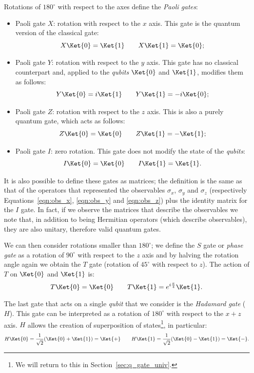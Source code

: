 Rotations of $180^\circ$ with respect to the axes define the \emph{Paoli gates}:
\begin{itemize}
	\item Paoli gate $X$: rotation with respect to the $x$ axis. This gate is the quantum version of the classical  gate:
	\[
	X\Ket{0} = \Ket{1} \qquad  X\Ket{1} = \Ket{0};
	\]
	\item Paoli gate $Y$: rotation with respect to the $y$ axis. This gate has no classical counterpart and, applied to the \emph{qubits} $\Ket{0}$ and $\Ket{1}$, modifies them as follows:
	\[
	Y\Ket{0} = i\Ket{1} \qquad  Y\Ket{1} = -i\Ket{0};
	\]
	\item Paoli gate $Z$: rotation with respect to the $z$ axis. This is also a purely quantum gate, which acts as follows:
	\[
	Z\Ket{0} = \Ket{0} \qquad  Z\Ket{1} = -\Ket{1};
	\]
	\item Paoli gate $I$: zero rotation. This gate does not modify the state of the \emph{qubits}:
	\[
	I\Ket{0} = \Ket{0} \qquad  I\Ket{1} = \Ket{1}.
	\]
\end{itemize}
It is also possible to define these gates as matrices; the definition is the same as that of the operators that represented the observables $\sigma_x$, $\sigma_y$ and $\sigma_z$ (respectively Equations~\ref{eqn:obs_x}, \ref{eqn:obs_y} and \ref{eqn:obs_z}) plus the identity matrix for the $I$ gate. In fact, if we observe the matrices that describe the observables we note that, in addition to being Hermitian operators (which describe observables), they are also unitary, therefore valid quantum gates.

We can then consider rotations smaller than $180^\circ$; we define the $S$ gate or \emph{phase gate} as a rotation of $90^\circ$ with respect to the $z$ axis and by halving the rotation angle again we obtain the $T$ gate (rotation of $45^\circ$ with respect to $z$). The action of $T$ on $\Ket{0}$ and $\Ket{1}$ is:
\[
T\Ket{0} = \Ket{0} \qquad  T\Ket{1} = e^{i\frac{\pi}{4}}\Ket{1}.
\]

The last gate that acts on a single \emph{qubit} that we consider is the \emph{Hadamard gate} ($H$). This gate can be interpreted as a rotation of $180^\circ$ with respect to the $x+z$ axis. $H$ allows the creation of superposition of states\footnote{We will return to this in Section~\ref{sec:q_gate_univ}.}, in particular:
\[
H\Ket{0} = \frac{1}{\sqrt{2}} (\Ket{0} + \Ket{1}) = \Ket{+} \qquad  H\Ket{1} = \frac{1}{\sqrt{2}} (\Ket{0} - \Ket{1}) = \Ket{-}.
\]

